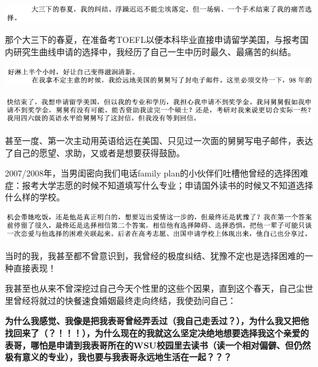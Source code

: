 \documentclass[9pt, b5paper]{article}
\begin{document}
\begin{center}
\includegraphics[width=.9\linewidth]{./pic/backups_plans_20210422_164435.png}
\end{center}

那个大三下的春夏，在准备考TOEFL以便本科毕业直接申请留学美国，与报考国内研究生曲线申请的选择中，我经历了自己一生中历时最久、最痛苦的纠结。

\begin{center}
\includegraphics[width=.9\linewidth]{./pic/backups_plans_20210423_091514.png}
\end{center}

\begin{center}
\includegraphics[width=.9\linewidth]{./pic/backups_plans_20210423_091638.png}
\end{center}

甚至一度、第一次主动用英语给远在美国、只见过一次面的舅舅写电子邮件，表达了自己的愿望、求助，又或者是想要获得鼓励。

2007/2008年，当男闺密向我们电话family plan的小伙伴们吐槽他曾经的选择困难症：报考大学志愿的时候不知道填写什么专业；申请国外读书的时候又不知道选择什么样的学校。

\begin{center}
\includegraphics[width=.9\linewidth]{./pic/backups_plans_20210422_221850.png}
\end{center}

当时的我，我甚至都不曾意识到，我曾经的极度纠结、犹豫不定也是选择困难的一种直接表现！

我甚至也从来不曾深挖过自己今天个性里的这些个因果，直到这个春天，自己尘世里曾经将就过的快餐速食婚姻最终走向终结，我使劲问自己：

\textbf{为什么我感觉、我像是把我表哥曾经弄丢过（我自己走丢过？），为什么我又把他找回来了（？！！！），为什么现在的我就这么坚定决绝地想要选择我这个亲爱的表哥，哪怕是申请到我表哥所在的WSU校园里去读书（读一个相对偏僻、但仍然极有意义的专业），我也要与我表哥永远地生活在一起？？？}
\end{document}
